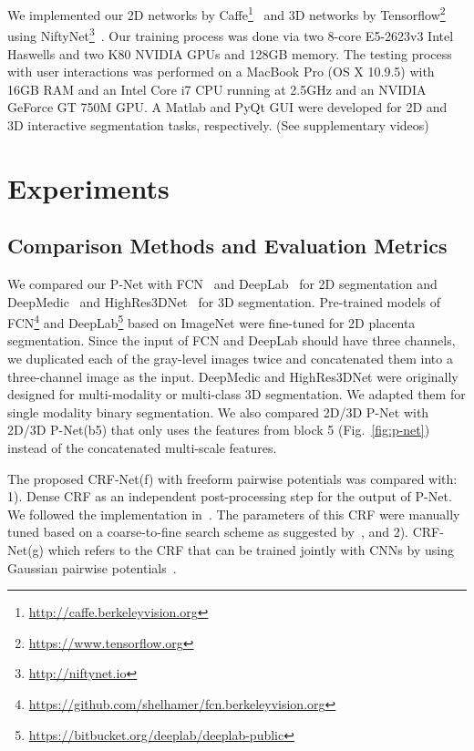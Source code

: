 \documentclass[10pt,journal,compsoc]{IEEEtran}
\begin{document}
We implemented our 2D networks by Caffe\footnote{\url{http://caffe.berkeleyvision.org}}~\cite{Jia2014} and 3D networks by Tensorflow\footnote{\url{https://www.tensorflow.org}}~\cite{Abadi2016} using NiftyNet\footnote{\url{http://niftynet.io}}~\cite{Li2017}. Our training process was done via two 8-core E5-2623v3 Intel Haswells and two K80 NVIDIA GPUs and 128GB memory. The testing process with user interactions was performed on a MacBook Pro (OS X 10.9.5) with 16GB RAM and an Intel Core i7 CPU running at 2.5GHz and an NVIDIA
GeForce GT 750M GPU. A Matlab and PyQt GUI were developed for 2D and 3D interactive segmentation tasks, respectively.
(See supplementary videos)
\section{Experiments}
\subsection{Comparison Methods and Evaluation Metrics}
We compared our P-Net with FCN~\cite{Long2014} and DeepLab~\cite{Chen2016deeplab} for 2D segmentation and DeepMedic~\cite{Kamnitsas2017} and HighRes3DNet~\cite{Li2017} for 3D segmentation. Pre-trained models of FCN\footnote{\url{https://github.com/shelhamer/fcn.berkeleyvision.org}} and DeepLab\footnote{\url{https://bitbucket.org/deeplab/deeplab-public}} based on ImageNet were fine-tuned for 2D placenta segmentation. %
Since the input of FCN and DeepLab should have three channels, we duplicated each of the gray-level images twice and concatenated them into a three-channel image as the input. DeepMedic and HighRes3DNet were originally designed for multi-modality or multi-class 3D segmentation. We adapted them for single modality binary segmentation. We also compared 2D/3D P-Net with 2D/3D P-Net(b5) that only uses the features from block 5 (Fig.~\ref{fig:p-net}) instead of the concatenated multi-scale features. 

The proposed CRF-Net(f) with freeform pairwise potentials was compared with: 1). Dense CRF as an independent post-processing step for the  output of P-Net. We followed the implementation  in~\cite{Krahenbuhl2011, Chen2016deeplab, Kamnitsas2017}.
The parameters of this CRF were manually tuned based on a coarse-to-fine search scheme as suggested by~\cite{Chen2016deeplab}, and 2). CRF-Net(g) which refers to the CRF that can be trained jointly with CNNs by using Gaussian pairwise potentials~\cite{Zheng2015a}.
\end{document}
